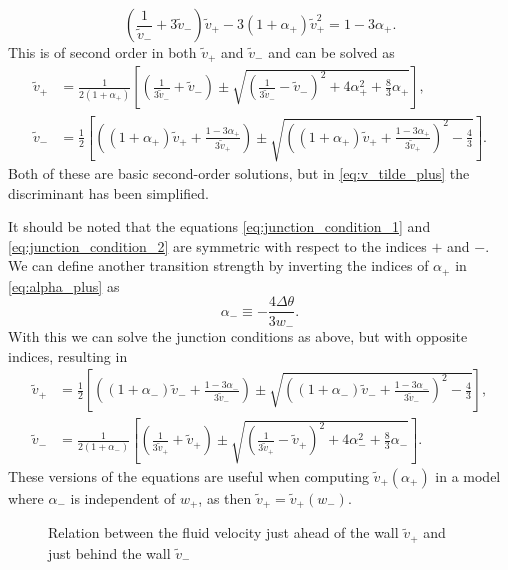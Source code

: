 \begin{equation}
\left( \frac{1}{\tilde{v}_-} + 3 \tilde{v}_- \right) \tilde{v}_+ - 3(1+\alpha_+)\tilde{v}_+^2 = 1 - 3\alpha_+.
\end{equation}
This is of second order in both $\tilde{v}_+$ and $\tilde{v}_-$ and can be solved as \cite[eq. B.6, B.7]{hindmarsh_gw_pt_2019}
\begin{align}
\tilde{v}_+ &= \frac{1}{2(1+\alpha_+)}\left[ \left(\frac{1}{3\tilde{v}_-}+\tilde{v}_-\right) \pm \sqrt{\left(\frac{1}{3\tilde{v}_-} - \tilde{v}_- \right)^2 + 4\alpha_+^2 + \frac{8}{3} \alpha_+} \right],
\label{eq:v_tilde_plus}
\\
\tilde{v}_- &= \frac{1}{2} \left[ \left( (1+\alpha_+)\tilde{v}_+ + \frac{1-3\alpha_+}{3\tilde{v}_+} \right) \pm \sqrt{\left((1+\alpha_+)\tilde{v}_+ + \frac{1-3\alpha_+}{3\tilde{v}_+} \right)^2 - \frac{4}{3}} \right].
\label{eq:v_tilde_minus}
\end{align}
Both of these are basic second-order solutions, but in \eqref{eq:v_tilde_plus} the discriminant has been simplified.

It should be noted that the equations \ref{eq:junction_condition_1} and \ref{eq:junction_condition_2} are symmetric with respect to the indices $+$ and $-$.
We can define another transition strength by inverting the indices of $\alpha_+$ in \ref{eq:alpha_plus} as
\begin{equation}
\alpha_- \equiv - \frac{4 \Delta \theta}{3 w_-}.
\end{equation}
With this we can solve the junction conditions as above, but with opposite indices, resulting in
\begin{align}
\tilde{v}_+ &= \frac{1}{2} \left[ \left( (1+\alpha_-)\tilde{v}_- + \frac{1-3\alpha_-}{3\tilde{v}_-} \right) \pm \sqrt{\left((1+\alpha_-)\tilde{v}_- + \frac{1-3\alpha_-}{3\tilde{v}_-} \right)^2 - \frac{4}{3}} \right],
\label{eq:v_tilde_plus_reverse}
\\
\tilde{v}_- &= \frac{1}{2(1+\alpha_-)}\left[ \left(\frac{1}{3\tilde{v}_+}+\tilde{v}_+\right) \pm \sqrt{\left(\frac{1}{3\tilde{v}_+} - \tilde{v}_+ \right)^2 + 4\alpha_-^2 + \frac{8}{3} \alpha_-} \right].
\label{eq:v_tilde_minus_reverse}
\end{align}
These versions of the equations are useful when computing $\tilde{v}_+(\alpha_+)$ in a model where $\alpha_-$ is independent of $w_+$, as then $\tilde{v}_+ = \tilde{v}_+(w_-)$.

\begin{figure}[h!]
\centering
{}
\caption{Relation between the fluid velocity just ahead of the wall $\tilde{v}_+$ and just behind the wall $\tilde{v}_-$ \cite[fig. 13]{lecture_notes}}
\label{fig:vplus_vminus}
\end{figure}

